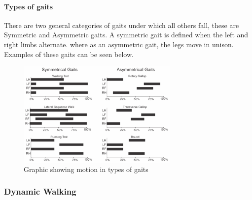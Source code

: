             \paragraph*{Types of gaits}
            There are two general categories of gaits under which all others fall, these are Symmetric and Asymmetric gaits. A symmetric gait is defined when the left and right limbs alternate. where as an asymmetric gait, the legs move in unison. Examples of these gaits can be seen below.  
            \begin{figure}[H]
                \centering
                \includegraphics[width=0.7\textwidth]{figures/Gait_graphs_v2.png}
                \caption{Graphic showing motion in types of gaits}
                \label{fig:GaitMotion}
            \end{figure}

        \subsubsection{Dynamic Walking}

